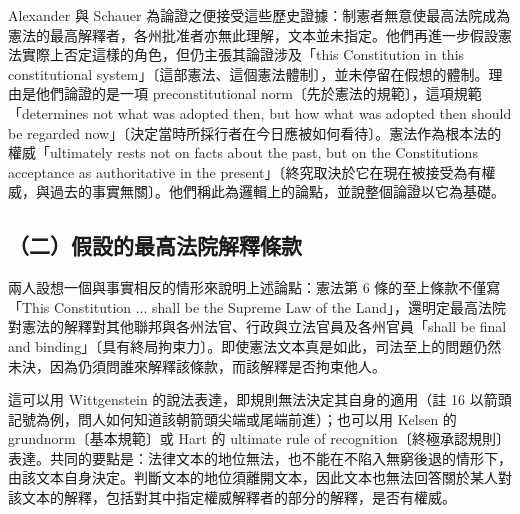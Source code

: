 Alexander 與 Schauer 為論證之便接受這些歷史證據：制憲者無意使最高法院成為憲法的最高解釋者，各州批准者亦無此理解，文本並未指定。他們再進一步假設憲法實際上否定這樣的角色，但仍主張其論證涉及「this Constitution in this constitutional system」〔這部憲法、這個憲法體制〕，並未停留在假想的體制。理由是他們論證的是一項 preconstitutional norm〔先於憲法的規範〕，這項規範「determines not what was adopted then, but how what was adopted then should be regarded now」〔決定當時所採行者在今日應被如何看待〕。憲法作為根本法的權威「ultimately rests not on facts about the past, but on the Constitution\textquotesingle s acceptance as authoritative in the present」〔終究取決於它在現在被接受為有權威，與過去的事實無關〕。他們稱此為邏輯上的論點，並說整個論證以它為基礎。

\subsection{（二）假設的最高法院解釋條款}

兩人設想一個與事實相反的情形來說明上述論點：憲法第 6 條的至上條款不僅寫「This Constitution ... shall be the Supreme Law of the Land」，還明定最高法院對憲法的解釋對其他聯邦與各州法官、行政與立法官員及各州官員「shall be final and binding」〔具有終局拘束力〕。即使憲法文本真是如此，司法至上的問題仍然未決，因為仍須問誰來解釋該條款，而該解釋是否拘束他人。

這可以用 Wittgenstein 的說法表達，即規則無法決定其自身的適用（註 16 以箭頭記號為例，問人如何知道該朝箭頭尖端或尾端前進）；也可以用 Kelsen 的 grundnorm〔基本規範〕或 Hart 的 ultimate rule of recognition〔終極承認規則〕表達。共同的要點是：法律文本的地位無法，也不能在不陷入無窮後退的情形下，由該文本自身決定。判斷文本的地位須離開文本，因此文本也無法回答關於某人對該文本的解釋，包括對其中指定權威解釋者的部分的解釋，是否有權威。

